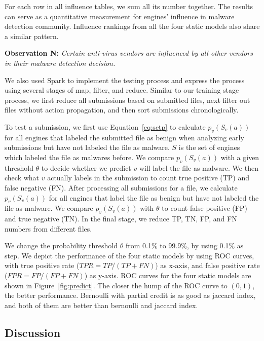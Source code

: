 For each row in all influence tables, we sum all its number together. 
The results can serve as a quantitative measurement for engines' influence in malware detection community. 
Influence rankings from all the four static models also share a similar pattern. 

{\bf Observation N:} 
{\em Certain anti-virus vendors are influenced by all other vendors in their malware detection decision.}

We also used Spark to implement the testing process and express the process using several stages of map, filter, and reduce.
Similar to our training stage process, 
we first reduce all submissions based on submitted files,
next filter out files without action propagation, 
and then sort submissions chronologically. 

To test a submission, we first use Equation~\ref{eq:setp} to
calculate $p_v(S_v(a))$ for all engines
that labeled the submitted file as benign when analyzing early submissions 
but have not labeled the file as malware. 
$S$ is the set of engines which labeled the file as malwares before.
We compare $p_v(S_v(a))$ with a given threshold $\theta$ to decide whether we predict 
$v$ will label the file as malware.
We then check what $v$ actually labels in the submission to count true positive (TP) and false negative (FN). 
After processing all submissions for a file, 
we calculate $p_v(S_v(a))$ for all engines  
that label the file as benign but have not labeled the file as malware.
We compare $p_v(S_v(a))$ with $\theta$ to count false positive (FP) and true negative (TN).
In the final stage, we reduce TP, TN, FP, and FN numbers from different files.



We change the probability threshold $\theta$ from 0.1\% to 99.9\%, 
by using 0.1\% as step. 
We depict the performance of the four static models by using ROC curves, 
with true positive rate ($TPR = TP/(TP+FN)$) as x-axis, 
and false positive rate ($FPR = FP/(FP + FN)$) as y-axis. 
ROC curves for the four static models are shown in Figure~\ref{fig:predict}. 
The closer the hump of the ROC curve to $(0,1)$, the better performance.
Bernoulli with partial credit is as good as jaccard index, 
and both of them are better than bernoulli and jaccard index. 


\subsection{Discussion}

